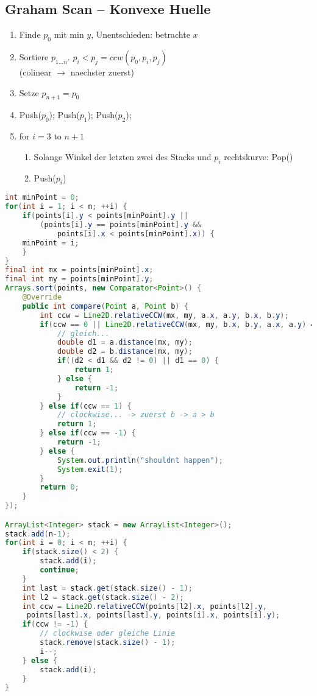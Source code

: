 \subsection{Graham Scan -- Konvexe Huelle}
        \begin{enumerate}
        \item Finde $p_0$ mit min $y$, Unentschieden: betrachte $x$
        \item Sortiere $p_{1\ldots n}$. $p_i < p_j = ccw(p_0,p_i,p_j)$\\
        (colinear $\rightarrow$ naechster zuerst)
        \item Setze $p_{n+1}=p_0$
        \item Push($p_0$); Push($p_1$); Push($p_2$);
        \item for $i=3$ to $n+1$
        \begin{enumerate}
            \item Solange Winkel der letzten zwei des Stacks und $p_i$ rechtskurve: Pop()
            \item Push($p_i$)
        \end{enumerate}
        \end{enumerate}
\begin{lstlisting}[language=Java]
int minPoint = 0;
for(int i = 1; i < n; ++i) {
	if(points[i].y < points[minPoint].y ||
		(points[i].y == points[minPoint].y &&
			points[i].x < points[minPoint].x)) {
	minPoint = i;
	}
}
final int mx = points[minPoint].x;
final int my = points[minPoint].y;
Arrays.sort(points, new Comparator<Point>() {
	@Override
	public int compare(Point a, Point b) {
		int ccw = Line2D.relativeCCW(mx, my, a.x, a.y, b.x, b.y);
		if(ccw == 0 || Line2D.relativeCCW(mx, my, b.x, b.y, a.x, a.y) == 0) {
			// gleich...
			double d1 = a.distance(mx, my);
			double d2 = b.distance(mx, my);
			if((d2 < d1 && d2 != 0) || d1 == 0) {
				return 1;
			} else {
				return -1;
			}
		} else if(ccw == 1) {
			// clockwise... -> zuerst b -> a > b
			return 1;
		} else if(ccw == -1) {
			return -1;
		} else {
			System.out.println("shouldnt happen");
			System.exit(1);
		}
		return 0;
	}
});

ArrayList<Integer> stack = new ArrayList<Integer>();
stack.add(n-1);
for(int i = 0; i < n; ++i) {
	if(stack.size() < 2) {
		stack.add(i);
		continue;
	}
	int last = stack.get(stack.size() - 1);
	int l2 = stack.get(stack.size() - 2);
	int ccw = Line2D.relativeCCW(points[l2].x, points[l2].y,
	 points[last].x, points[last].y, points[i].x, points[i].y);
	if(ccw != -1) {
		// clockwise oder gleiche Linie
		stack.remove(stack.size() - 1);
		i--;
	} else {
		stack.add(i);
	}
}
\end{lstlisting}